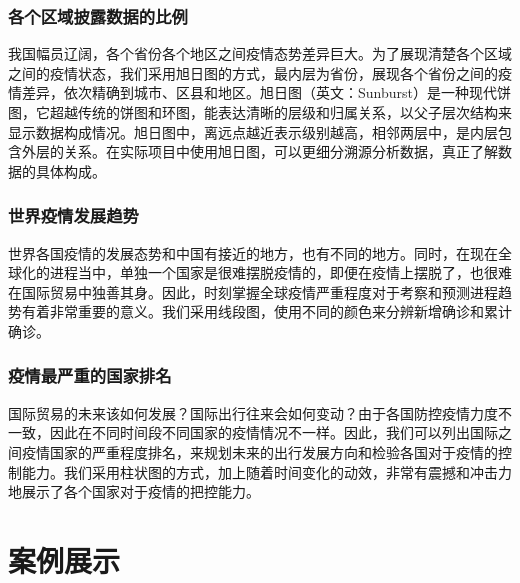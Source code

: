 \documentclass{ctexart}
\begin{document}
\subsubsection{各个区域披露数据的比例}
我国幅员辽阔，各个省份各个地区之间疫情态势差异巨大。为了展现清楚各个区域之间的疫情状态，我们采用旭日图的方式，最内层为省份，展现各个省份之间的疫情差异，依次精确到城市、区县和地区。旭日图（英文：Sunburst）是一种现代饼图，它超越传统的饼图和环图，能表达清晰的层级和归属关系，以父子层次结构来显示数据构成情况。旭日图中，离远点越近表示级别越高，相邻两层中，是内层包含外层的关系。在实际项目中使用旭日图，可以更细分溯源分析数据，真正了解数据的具体构成。
\subsubsection{世界疫情发展趋势}
世界各国疫情的发展态势和中国有接近的地方，也有不同的地方。同时，在现在全球化的进程当中，单独一个国家是很难摆脱疫情的，即便在疫情上摆脱了，也很难在国际贸易中独善其身。因此，时刻掌握全球疫情严重程度对于考察和预测进程趋势有着非常重要的意义。我们采用线段图，使用不同的颜色来分辨新增确诊和累计确诊。
\subsubsection{疫情最严重的国家排名}
国际贸易的未来该如何发展？国际出行往来会如何变动？由于各国防控疫情力度不一致，因此在不同时间段不同国家的疫情情况不一样。因此，我们可以列出国际之间疫情国家的严重程度排名，来规划未来的出行发展方向和检验各国对于疫情的控制能力。我们采用柱状图的方式，加上随着时间变化的动效，非常有震撼和冲击力地展示了各个国家对于疫情的把控能力。
\section{案例展示}
\end{document}
